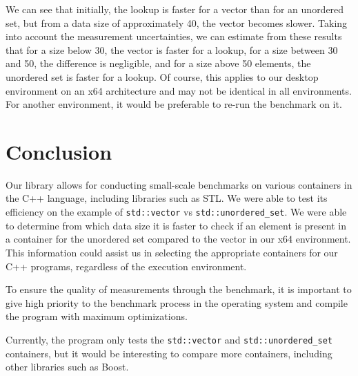 \documentclass[conference]{IEEEtran} \IEEEoverridecommandlockouts \usepackage{graphicx}
\def\code#1{\texttt{#1}}
\begin{document}
We can see that initially, the lookup is faster for a vector than for an unordered set,
but from a data size of approximately 40, the vector becomes slower. Taking into account
the measurement uncertainties, we can estimate from these results that for a size below
30, the vector is faster for a lookup, for a size between 30 and 50, the difference is
negligible, and for a size above 50 elements, the unordered set is faster for a lookup. Of
course, this applies to our desktop environment on an x64 architecture and may not be
identical in all environments. For another environment, it would be preferable to re-run
the benchmark on it.

\section{Conclusion}

Our library allows for conducting small-scale benchmarks on various containers in the C++
language, including libraries such as STL. We were able to test its efficiency on the
example of \code{std::vector} vs \code{std::unordered\_set}. We were able to determine
from which data size it is faster to check if an element is present in a container for the
unordered set compared to the vector in our x64 environment. This information could assist
us in selecting the appropriate containers for our C++ programs, regardless of the
execution environment.

To ensure the quality of measurements through the benchmark, it is important to give high
priority to the benchmark process in the operating system and compile the program with
maximum optimizations.

Currently, the program only tests the \code{std::vector} and \code{std::unordered\_set}
containers, but it would be interesting to compare more containers, including other
libraries such as Boost.

 
\end{document}
